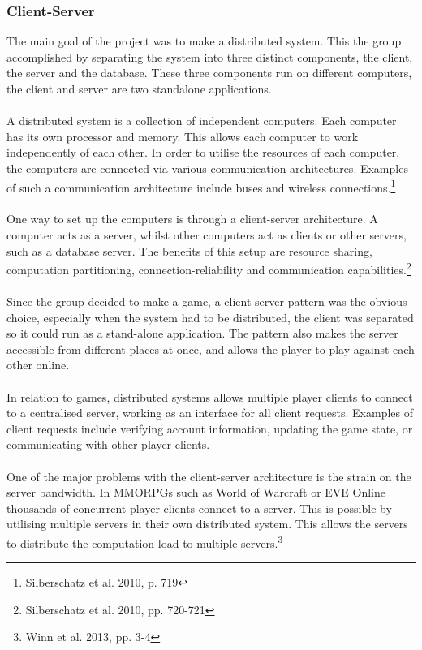 \subsubsection{Client-Server}
The main goal of the project was to make a distributed system. This the group
accomplished by separating the system into three distinct components, the
client, the server and the database. These three components run on different
 computers, the client and server are two standalone applications.
\\
\\
A distributed system is a collection of independent computers. Each computer
has its own processor and memory. This allows each computer to work
independently of each other. In order to utilise the resources of each
computer, the computers are connected via various communication architectures.
 Examples of such a communication architecture include buses and wireless
  connections.\footnote{Silberschatz et al. 2010, p. 719}
\\
\\
One way to set up the computers is through a client-server architecture. A
computer acts as a server, whilst other computers act as clients or other
servers, such as a database server. The benefits of this setup are resource
sharing, computation partitioning, connection-reliability and communication
capabilities.\footnote{Silberschatz et al. 2010, pp. 720-721}
\\
\\
Since the group decided to make a game, a client-server pattern was the
obvious choice, especially when the system had to be distributed, the client
was separated so it could run as a stand-alone application. The pattern also
makes the server accessible from different places at once, and allows the
player to play against each other online.
\\
\\
In relation to games, distributed systems allows multiple player clients to
connect to a centralised server, working as an interface for all client
requests. Examples of client requests include verifying account information,
updating the game state, or communicating with other player clients.
\\
\\
One of the major problems with the client-server architecture is the strain
on the server bandwidth. In MMORPGs such as World of Warcraft or EVE Online
thousands of concurrent player clients connect to a server. This is possible
by utilising multiple servers in their own distributed system. This allows
the servers to distribute the computation load to multiple
servers.\footnote{Winn et al. 2013, pp. 3-4}
\newpage
